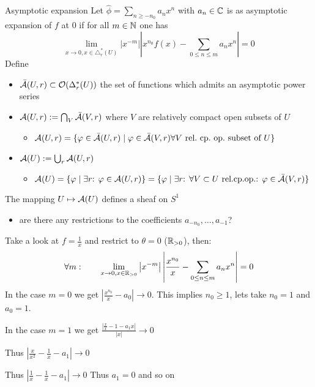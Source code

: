 \begin{frame}{Asymptotic expansion}
Let $\hat\phi=\sum_{n\geq-n_0}a_nx^n$ with $a_n\in\mathbb{C}$ is as asymptotic
expansion of $f$ at $0$ if for all $m\in\mathbb{N}$ one has
\begin{equation} \label{eq:asymptoticExpansion}
  \lim_{x\to 0,x\in\triangle_r^*(U)}
  \left|x^{-m}\right|\left|x^{n_{0}}f(x)-\sum_{0\leq n\leq m}a_{n}x^{n}\right|
  =0
\end{equation}
Define
\begin{itemize}
  \item $\bar{\mathcal{A}}(U,r)\subset\mathcal{O}(\Delta_r^*(U))$ the set of functions which
    admits an asymptotic power series
  \item $\mathcal{A}(U,r):=\bigcap_{V}\bar{\mathcal{A}}(V,r)$ where $V$ are relatively
    compact open subsets of $U$
    \begin{itemize}
      \item $\mathcal{A}(U,r)=\{\varphi\in \bar{\mathcal{A}}(U,r)
        \mid \varphi\in \bar{\mathcal{A}}(V,r)
        \forall V\text{ rel.\  cp.\  op.\  subset of }U\}$
    \end{itemize}
  \item $\mathcal{A}(U):=\bigcup_r\mathcal{A}(U,r)$%
    \begin{itemize}
      \item $\mathcal{A}(U)=\{\varphi\mid\exists r\text{: } \varphi\in\mathcal{A}(U,r)\}
        =\{\varphi\mid\exists r\text{: }
          \forall V\subset U\text{ rel.cp.op.}\text{: }
          \varphi\in\bar{\mathcal{A}}(V,r)\}$
    \end{itemize}
\end{itemize}
The mapping $U\mapsto\mathcal{A}(U)$ defines a sheaf on $S^1$
\end{frame}

\begin{frame}
\begin{probl}
\begin{itemize}
  \item are there any restrictions to the coefficients $a_{-n_0},\dots,a_{-1}$?
\end{itemize}
\end{probl}
Take a look at $f=\frac{1}{x}$ and restrict to $\theta=0$ ($\mathbb{R}_{>0}$), then:
\[
  \forall m : \qquad
  \lim_{x\to 0,x\in\mathbb{R}_{>0}}
  \left|x^{-m}\right|\left|\frac{x^{n_{0}}}{x}
    -\sum_{0\leq n\leq m}a_{n}x^{n}\right| =0
\]
In the case $m=0$ we get $\left|\frac{x^{n_{0}}}{x} -a_{0}\right|\to0$. This
implies $n_0\geq1$, lets take $n_0=1$ and $a_0=1$.

In the case $m=1$ we get
$\frac{\left|\frac{x}{x} -1 -a_1x\right|}{|x|}\to0$

Thus
$ \left|\frac{x}{x^2} -\frac{1}{x} -a_1\right|\to0 $

Thus
$ \left|\frac{1}{x} -\frac{1}{x} -a_1\right|\to0$ Thus $a_1=0$ and so on
\end{frame}


